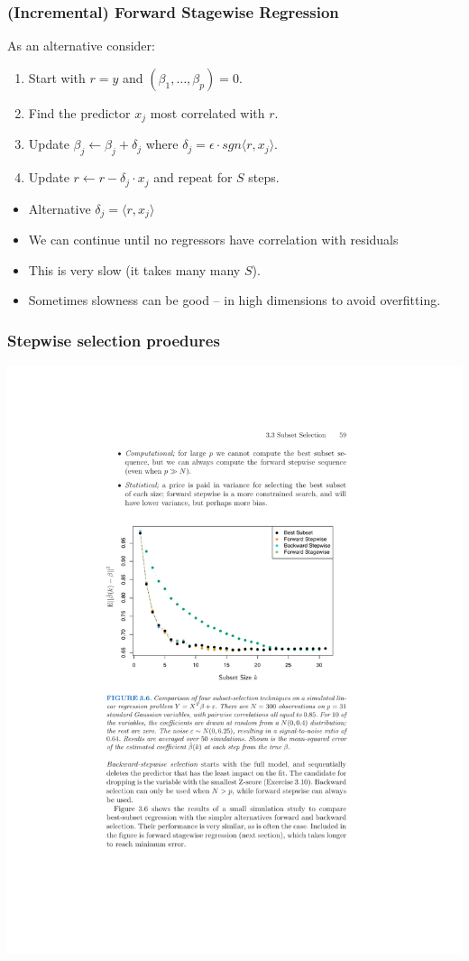 \documentclass[xcolor=pdftex,dvipsnames,table,mathserif,aspectratio=169]{beamer}
\begin{document}
\begin{frame}
\frametitle{(Incremental) Forward Stagewise Regression}
As an alternative consider:
\begin{enumerate}
\item Start with $r= y$ and $(\beta_1, \ldots, \beta_p) = 0$.
\item Find the predictor $x_j$ most correlated with $r$.
\item Update $\beta_j \leftarrow \beta_j + \delta_j$ where $\delta_j = \epsilon \cdot sgn \langle r , x_j \rangle$.
\item Update $r \leftarrow r - \delta_j \cdot x_j$ and repeat for $S$ steps.
\end{enumerate}
\begin{itemize}
\item Alternative $\delta_j =  \langle r , x_j \rangle$
\item We can continue until no regressors have correlation with residuals 
\item This is very slow (it takes many many $S$).
\item Sometimes slowness can be good -- in high dimensions to avoid overfitting.
\end{itemize}
\end{frame}



\begin{frame}
\frametitle{Stepwise selection proedures}
\begin{center}
\includegraphics[height=0.9\textheight]{./resources/subsetstepwise}
\end{center}
\end{frame}
\end{document}
